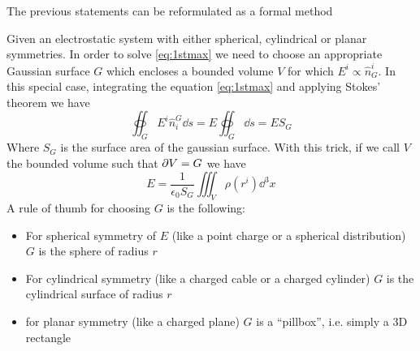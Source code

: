 \documentclass[../electromagnetism]{subfiles}
\begin{document}
The previous statements can be reformulated as a formal method
\begin{mtd}
	Given an electrostatic system with either spherical, cylindrical or planar symmetries. In order to solve \eqref{eq:1stmax} we need to choose an appropriate Gaussian surface $G$ which encloses a bounded volume $V$ for which $E^i\propto\hat{n}^i_G$. In this special case, integrating the equation \eqref{eq:1stmax} and applying Stokes' theorem we have
	\begin{equation}
		\oiint_GE^i\hat{n}_i^G\dd s=E\oiint_G\dd s=ES_G
		\label{eq:gausssurftrick}
	\end{equation}
	Where $S_G$ is the surface area of the gaussian surface. With this trick, if we call $V$ the bounded volume such that $\partial V=G$ we have
	\begin{equation*}
		E=\frac{1}{\epsilon_0 S_G}\iiint_V\rho(r^i)\dd^3x
	\end{equation*}
	A rule of thumb for choosing $G$ is the following:
	\begin{itemize}
	\item For spherical symmetry of $E$ (like a point charge or a spherical distribution) $G$ is the sphere of radius $r$
	\item For cylindrical symmetry (like a charged cable or a charged cylinder) $G$ is the cylindrical surface of radius $r$
	\item for planar symmetry (like a charged plane) $G$ is a ``pillbox'', i.e. simply a 3D rectangle
	\end{itemize}
\end{mtd}
\end{document}
